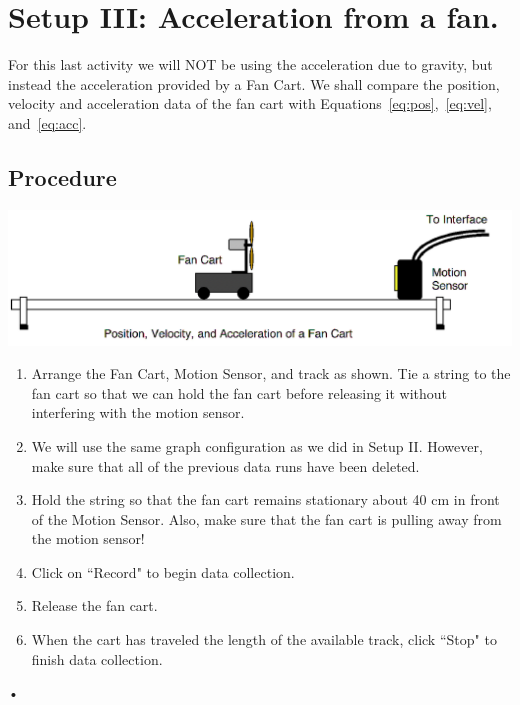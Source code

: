 \documentclass[main.tex]{subfiles}
\begin{document}
\section{Setup III: Acceleration from a fan.}
For this last activity we will NOT be using the acceleration due to gravity, but instead the acceleration provided by a Fan Cart. We shall compare the position, velocity and acceleration data of the fan cart with Equations~\eqref{eq:pos},~\eqref{eq:vel}, and~\eqref{eq:acc}.

\subsection*{Procedure}
\includegraphics[width=\textwidth]{Accel_3_Setup}
\begin{enumerate}
\item
Arrange the Fan Cart, Motion Sensor, and track as shown. Tie a string to the fan cart so that we can hold the fan cart before releasing it without interfering with the motion sensor.
\item
We will use the same graph configuration as we did in Setup II. However, make sure that all of the previous data runs have been deleted.
\item
Hold the string so that the fan cart remains stationary about 40 cm in front of the Motion Sensor. Also, make sure that the fan cart is pulling away from the motion sensor!
\item
Click on ``Record" to begin data collection.
\item
Release the fan cart.
\item
When the cart has traveled the length of the available track, click ``Stop" to finish data collection.
\end{enumerate}•
\end{document}
